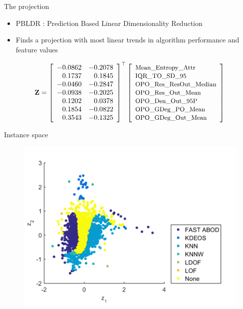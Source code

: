 \documentclass{beamer}
\begin{document}
\begin{darkframes}
\begin{frame}{The projection}
\begin{itemize}
    \item PBLDR : Prediction Based Linear Dimensionality Reduction 
    \item Finds a projection with most linear trends in algorithm performance and feature values
\end{itemize}
\begin{equation*}
	\textbf{Z} =
	\left[
		\begin{array}{rr}
		-0.0862 &   -0.2078 \\ %
		 0.1737 &    0.1845 \\ %
		-0.0460 &   -0.2847 \\ %
		-0.0938 &   -0.2025 \\ %
		 0.1202 &    0.0378 \\ %
		 0.1854 &   -0.0822 \\ %
		 0.3543 &   -0.1325 \\ %
		\end{array}%
		\right]^{\top} 
	\left[
		\begin{array}{l} 
			\text{\small{Mean\_Entropy\_Attr}}      \\ %
			\text{\small{IQR\_TO\_SD\_95}}          \\ %
			\text{\small{OPO\_Res\_ResOut\_Median}} \\ %
			\text{\small{OPO\_Res\_Out\_Mean}}      \\ %
			\text{\small{OPO\_Den\_Out\_95P}}       \\ %
			\text{\small{OPO\_GDeg\_PO\_Mean}}      \\ %
			\text{\small{OPO\_GDeg\_Out\_Mean}}     \\ %
		\end{array}
		\right]
			\label{eq:projection_model}
\end{equation*}
\end{frame}    

\begin{frame}{Instance space}
    \begin{figure}
        \centering
        \includegraphics[scale= 0.6]{svm_pbldr_family.png}
    \end{figure}
\end{frame}



\end{darkframes}
\end{document}
